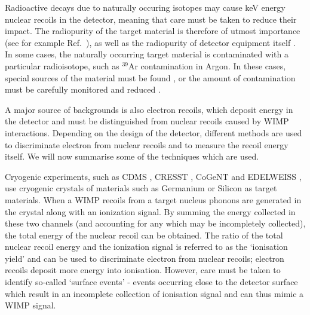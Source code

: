 Radioactive decays due to naturally occuring isotopes may cause keV energy nuclear recoils in the detector, meaning that care must be taken to reduce their impact. The radiopurity of the target material is therefore of utmost importance (see for example Ref.~\cite{Munster:2014}), as well as the radiopurity of detector equipment itself \cite{Bernabei:2008b,Kuzniak:2012}. In some cases, the naturally occurring target material is contaminated with a particular radioisotope, such as $^{39}$Ar contamination in Argon. In these cases, special sources of the material must be found \cite{Galbiati:2008}, or the amount of contamination must be carefully monitored and reduced \cite{Abe:2009,Aprile:2013a}.

A major source of backgrounds is also electron recoils, which deposit energy in the detector and must be distinguished from nuclear recoils caused by WIMP interactions. Depending on the design of the detector, different methods are used to discriminate electron from nuclear recoils and to measure the recoil energy itself. We will now summarise some of the techniques which are used.


Cryogenic experiments, such as CDMS \cite{Ahmed:2009b,Ahmed:2009, Ahmed:2011,Agnese:2013}, CRESST \cite{Angloher:2012}, CoGeNT \cite{Aalseth:2011a,Aalseth:2011b, Aalseth:2013,Aalseth:2014a,Aalseth:2014b} and EDELWEISS \cite{Armengaud:2011}, use cryogenic crystals of materials such as Germanium or Silicon as target materials. When a WIMP recoils from a target nucleus phonons are generated in the crystal along with an ionization signal. By summing the energy collected in these two channels (and accounting for any which may be incompletely collected), the total energy of the nuclear recoil can be obtained. The ratio of the total nuclear recoil energy and the ionization signal is referred to as the `ionisation yield' and can be used to discriminate electron from nuclear recoils; electron recoils deposit more energy into ionisation. However, care must be taken to identify so-called `surface events' - events occurring close to the detector surface which result in an incomplete collection of ionisation signal and can thus mimic a WIMP signal.

